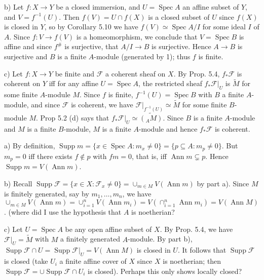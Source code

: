 \documentclass{report}
\newcommand{\F}{\mathcal{F}}
\DeclareMathOperator{\Supp}{Supp}
\DeclareMathOperator{\Spec}{Spec}
\DeclareMathOperator{\Ann}{Ann}
\begin{document}
\noindent
b)	Let $f:X\rightarrow Y$ be a closed immersion, and $U=\Spec A$ an affine subset of $Y$, and $V=f^{-1}(U)$.
Then $f(V)=U\cap f(X)$ is a closed subset of $U$ since $f(X)$ is closed in $Y$, so by Corollary 5.10 we have
$f(V)\simeq \Spec A/I$ for some ideal $I$ of $A$.  Since $f:V\rightarrow f(V)$ is a homeomorphism, 
we conclude that $V=\Spec B$ is affine and since $f^{\#}$ is surjective, that $A/I\rightarrow B$ is surjective.
Hence $A\rightarrow B$ is surjective and $B$ is a finite $A$-module (generated by 1); thus $f$ is finite.

\noindent
c)	Let $f:X\rightarrow Y$ be finite and $\F$ a coherent sheaf on $X$.	By Prop. 5.4, $f_*\F$ is coherent on $Y$
iff for any affine $U=\Spec A$, the restricted sheaf $f_*\F\big|_U$ is $\widetilde{M}$ for some finite $A$-module $M$.
Since $f$ is finite, $f^{-1}(U)=\Spec B$ with $B$ a finite $A$-module, and since $\F$ is coherent,
we have $\F\big|_{f^{-1}(U)}\simeq \widetilde{M}$ for some finite $B$-module $M$.  
Prop 5.2 (d) says that $f_*\F\big|_U\simeq \widetilde{({}_A M)}$.  Since $B$ is a finite $A$-module
and $M$ is a finite $B$-module, $M$ is a finite $A$-module and hence $f_*\F$ is coherent.


\bigskip
{}	a)	By definition, $\Supp m=\{x\in \Spec A: m_x\neq 0\}=\{p\subseteq A: m_p\neq 0\}$.
But $m_p=0$ iff there exists $f\not\in p$ with $fm=0$, that is, iff $\Ann m\subsetneq p$.
Hence $\Supp m=V(\Ann m)$.

\noindent
b)	Recall $\Supp\F=\{x\in X:\F_x\neq 0\}=\cup_{m\in M} V(\Ann m)$ by part a).  Since $M$ is finitely generated,
say by $m_1,\ldots,m_n$, we have $\cup_{m\in M} V(\Ann m)=\cup_{i=1}^n V(\Ann m_i)=V(\cap_{i=1}^n \Ann m_i)=V(\Ann M)$.
(where did I use the hypothesis that $A$ is noetherian?

\noindent
c)	Let $U=\Spec A$ be any open affine subset of $X$.  By Prop. 5.4, we have $\F\big|_{U}=\widetilde{M}$
with $M$ a finitely generated $A$-module.  By part b), $\Supp \F \cap U=\Supp \F\big|_{U}=V(\Ann M)$ is closed in
$U$.		It follows that $\Supp\F$ is closed (take $U_i$ a finite affine cover of $X$ since $X$ is noetherian;
then $ \Supp \F=\cup \Supp\F\cap U_i$ is closed).  Perhaps this only shows locally closed?
\end{document}
